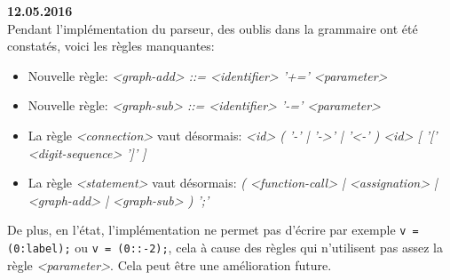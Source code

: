 \documentclass[french]{article}
\begin{document}
				\textbf{12.05.2016}\\
				Pendant l'implémentation du parseur, des oublis dans la grammaire ont été constatés, voici les règles manquantes:
				\begin{itemize}
					\item Nouvelle règle: \textit{<graph-add> ::= <identifier> '+=' <parameter>}
					\item Nouvelle règle: \textit{<graph-sub> ::= <identifier> '-=' <parameter>}
					\item La règle \textit{<connection>} vaut désormais: \textit{<id> ( '\textendash-' | '->' | '<-' ) <id> [ '[' <digit-sequence> ']' ]}
					\item La règle \textit{<statement>} vaut désormais: \textit{( <function-call> | <assignation> | <graph-add> | <graph-sub> ) ';'}
				\end{itemize}
				De plus, en l'état, l'implémentation ne permet pas d'écrire par exemple \texttt{v = (0:label);} ou \texttt{v = (0::-2);}, cela à cause des règles qui n'utilisent pas assez la règle \textit{<parameter>}. Cela peut être une amélioration future.
				
\end{document}
